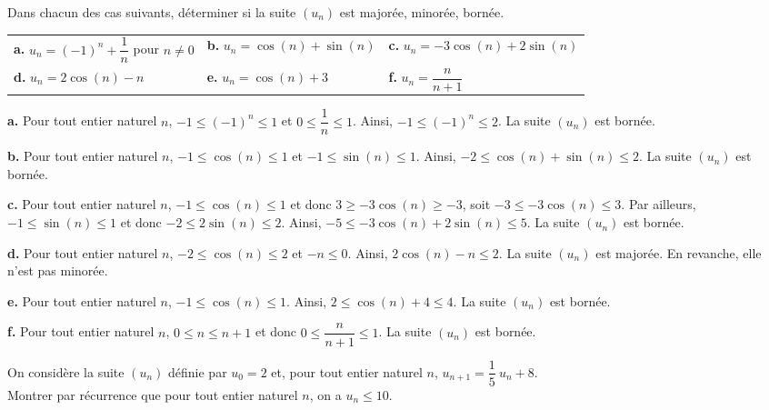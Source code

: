 \documentclass[11pt,fleqn]{book} %
\begin{document}
\begin{exercise}
Dans chacun des cas suivants, déterminer si la suite $(u_n)$ est majorée, minorée, bornée.

\renewcommand{\arraystretch}{2.5}
\begin{tabularx}{\linewidth}{XXX}

\textbf{a.} $u_n= (-1)^n+\dfrac{1}{n}$ pour $n\neq 0$ & \textbf{b.} $u_n= \cos(n) + \sin (n)$ & \textbf{c.} $u_n= -3\cos(n)+2\sin(n)$ \\
\textbf{d.} $u_n= 2\cos(n)-n$ & \textbf{e.} $u_n = \cos (n) + 3$ & \textbf{f.} $u_n = \dfrac{n}{n+1}$ \\
\end{tabularx}\end{exercise}

\begin{solution} \textbf{a.} Pour tout entier naturel $n$, $-1 \leqslant (-1)^n \leqslant 1$ et $0\leqslant \dfrac{1}{n} \leqslant 1$. Ainsi, $-1 \leqslant (-1)^n \leqslant 2$. La suite $(u_n)$ est bornée.

\textbf{b.} Pour tout entier naturel $n$, $-1 \leqslant \cos(n) \leqslant 1$ et $-1\leqslant  \sin(n) \leqslant 1$. Ainsi, $-2 \leqslant \cos(n)+\sin(n) \leqslant 2$. La suite $(u_n)$ est bornée.

\textbf{c.} Pour tout entier naturel $n$, $-1 \leqslant \cos(n) \leqslant 1$ et donc $ 3 \geqslant -3 \cos(n) \geqslant -3$, soit $-3 \leqslant -3 \cos(n) \leqslant 3$. Par ailleurs, $-1\leqslant  \sin(n) \leqslant 1$ et donc $-2\leqslant 2\sin(n) \leqslant 2$. Ainsi, $-5 \leqslant -3\cos(n)+2\sin(n) \leqslant 5$. La suite $(u_n)$ est bornée.

\textbf{d.} Pour tout entier naturel $n$, $-2 \leqslant \cos (n) \leqslant 2$ et $-n \leqslant 0$. Ainsi, $2\cos(n) -n \leqslant 2$. La suite $(u_n)$ est majorée. En revanche, elle n'est pas minorée.

\textbf{e.} Pour tout entier naturel $n$, $-1 \leqslant \cos(n) \leqslant 1$. Ainsi, $2 \leqslant \cos(n)+4 \leqslant 4$. La suite $(u_n)$ est bornée.

\textbf{f.} Pour tout entier naturel $n$, $0 \leqslant n \leqslant n+1$ et donc $ 0\leqslant \dfrac{n}{n+1} \leqslant 1$. La suite $(u_n)$ est bornée.\end{solution}


\begin{exercise}
On considère la suite $(u_n)$ définie par $u_0=2$ et, pour tout entier naturel $n$, $u_{n+1}=\dfrac{1}{5}\ u_n + 8$. \\ Montrer par récurrence que pour tout entier naturel $n$, on a $u_n \leqslant 10$.\end{exercise}
\end{document}
